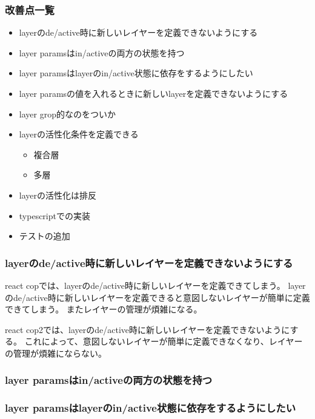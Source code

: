 \documentclass{jsarticle}
\begin{document}
    \subsubsection{改善点一覧}
    \begin{itemize}
    \item layerのde/active時に新しいレイヤーを定義できないようにする
    \item layer paramsはin/activeの両方の状態を持つ
    \item layer paramsはlayerのin/active状態に依存をするようにしたい
    \item layer paramsの値を入れるときに新しいlayerを定義できないようにする
    \item layer grop的なのをついか
    \item layerの活性化条件を定義できる
    \begin{itemize}
    \item 複合層
    \item 多層
    \end{itemize}
    \item layerの活性化は排反
    \item typescriptでの実装
    \item テストの追加
    \end{itemize}

    \subsubsection{layerのde/active時に新しいレイヤーを定義できないようにする}
    react copでは、layerのde/active時に新しいレイヤーを定義できてしまう。
    layerのde/active時に新しいレイヤーを定義できると意図しないレイヤーが簡単に定義できてしまう。
    またレイヤーの管理が煩雑になる。

    react cop2では、layerのde/active時に新しいレイヤーを定義できないようにする。
    これによって、意図しないレイヤーが簡単に定義できなくなり、レイヤーの管理が煩雑にならない。


    \subsubsection{layer paramsはin/activeの両方の状態を持つ}

    \subsubsection{layer paramsはlayerのin/active状態に依存をするようにしたい}
\end{document}

